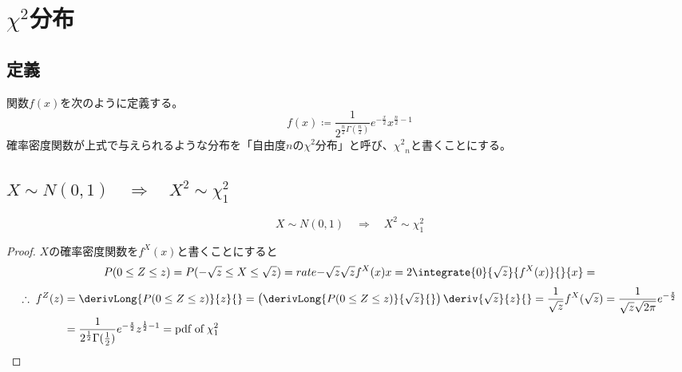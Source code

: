 \chapter{\texorpdfstring{$\chi^2$}{χ\string^2}分布}
    \section{定義}
        \begin{shadebox}
            関数$f(x)$を次のように定義する。
            \[f(x) \coloneqq \frac{1}{2^{\frac{n}{2}\Gamma\left(\frac{n}{2}\right)}}e^{-\frac{x}{2}}x^{\frac{n}{2}-1}\]
            確率密度関数が上式で与えられるような分布を「自由度$n$の$\chi^2$分布」と呼び、${\chi^2}_n$と書くことにする。
        \end{shadebox}
    \section{\texorpdfstring{$X \sim N(0,1) \quad \Rightarrow \quad X^2 \sim \chi^2_1$}{X～N(0,1) ⇒ X\string^2～χ\string^2\_1}}
        \begin{shadebox}
            \[X \sim N(0,1) \quad \Rightarrow \quad X^2 \sim \chi^2_1\]
        \end{shadebox}
        \begin{proof}
            \quad\par
            $X$の確率密度関数を$f^X(x)$と書くことにすると
            \[P(0\leq Z \leq z) = P(-\sqrt{z}\leq X \leq\sqrt{z}) = rate{-\sqrt{z}}{\sqrt{z}}{f^X(x)}{}{x} = 2\integrate{0}{\sqrt{z}}{f^X(x)}{}{x} = \]
            \begin{align*}
                \therefore \; f^Z(z) &= \derivLong{P(0\leq Z \leq z)}{z}{} = \left(\derivLong{P(0\leq Z \leq z)}{\sqrt{z}}{}\right)\deriv{\sqrt{z}}{z}{} = \frac{1}{\sqrt{z}}f^X(\sqrt{z}) = \frac{1}{\sqrt{z}\sqrt{2\pi}}e^{-\frac{z}{2}}\\
                &= \frac{1}{2^{\frac{1}{2}}\Gamma(\frac{1}{2})}e^{-\frac{z}{2}}z^{\frac{1}{2}-1} = \text{pdf of}\;\chi^2_1
            \end{align*}
        \end{proof}
